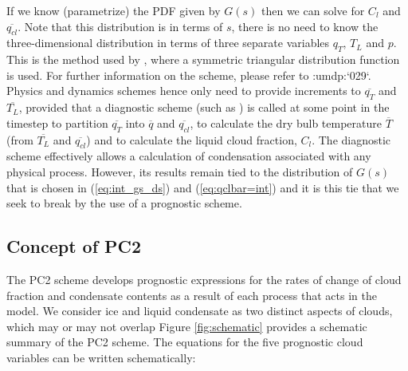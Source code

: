 \documentclass{UMDP_article}
\newcommand{\citeumdp}[1]{:umdp:`#1`}
\begin{document}
If we know (parametrize) the PDF given by $G(s)$ then we can solve
for $C_l$ and $\overline{q_{cl}}$. Note that this distribution is in terms of
$s$, there is no need to know the three-dimensional distribution in terms
of three separate variables $q_T$, $T_L$ and $p$. This is the method used
by \cite{smith90}, where a
symmetric triangular distribution function is used. For further
information on the \cite{smith90} scheme, please refer to \citeumdp{029}. Physics and dynamics schemes hence only need to
provide increments to $\overline{q_T}$ and $\overline{T_L}$,
provided that a diagnostic scheme (such as \cite{smith90}) is called at some point in the
timestep to partition $\overline{q_T}$ into $\overline{q}$ and $\overline{q_{cl}}$,
to calculate the dry bulb temperature $\overline{T}$ (from $\overline{T_L}$
and $\overline{q_{cl}}$) and to calculate the liquid
cloud fraction, $C_l$. The diagnostic scheme effectively allows a calculation of
condensation associated with any physical process. However, its results remain
tied to the distribution of $G(s)$ that is chosen in (\ref{eq:int_gs_ds}) and
(\ref{eq:qclbar=int}) and it is this tie that we seek to break by the use of
a prognostic scheme.

\subsection{Concept of PC2}

The PC2 scheme develops prognostic expressions for the rates of change of
cloud fraction and condensate contents as a result of each process that acts in
the model. We consider ice and liquid condensate as two distinct
aspects of clouds, which may or may not overlap 
Figure \ref{fig:schematic} provides a schematic summary of the PC2 scheme.  
The equations for the five prognostic cloud variables can be written schematically: 
\end{document}
